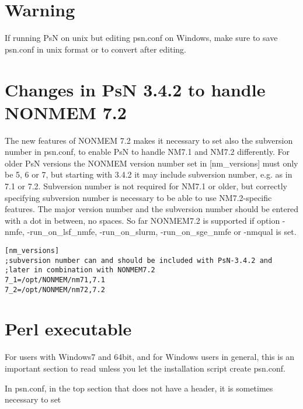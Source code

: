 \section{Warning}
If running PsN on unix but editing psn.conf on Windows, make sure to save psn.conf in unix format or to convert after editing.

\section{Changes in PsN 3.4.2 to handle NONMEM 7.2}
The new features of NONMEM 7.2 makes it necessary to set also the subversion number in psn.conf, to enable PsN to handle NM7.1 and NM7.2 differently. For older PsN versions the NONMEM version  number set in [nm\_versions] must only be 5, 6 or 7, but starting with 3.4.2 it may include subversion number, e.g. as in 7.1 or 7.2. Subversion number is not required for NM7.1 or older, but correctly specifying subversion number is necessary to be able to use NM7.2-specific features. The major version number and the subversion number should be entered with a dot in between, no spaces.  
So far NONMEM7.2 is supported if option -nmfe, -run\_on\_lsf\_nmfe, -run\_on\_slurm, -run\_on\_sge\_nmfe or -nmqual is set. 
\begin{verbatim}
[nm_versions]
;subversion number can and should be included with PsN-3.4.2 and
;later in combination with NONMEM7.2 
7_1=/opt/NONMEM/nm71,7.1
7_2=/opt/NONMEM/nm72,7.2
\end{verbatim}


\section{Perl executable}
For users with Windows7 and 64bit, and for Windows users in general, this is an important section to read unless you let the installation script create psn.conf.

In psn.conf, in the top section that does not have a header, it is sometimes necessary to set

